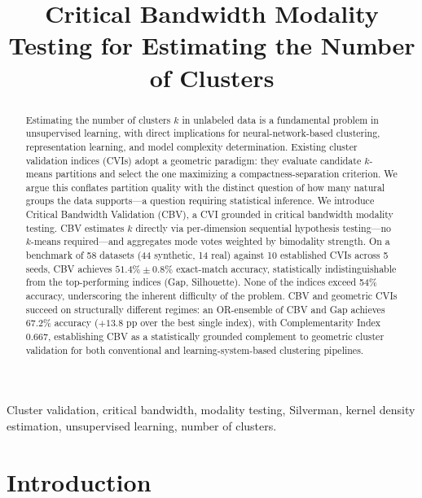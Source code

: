 \documentclass[journal]{IEEEtran}
\begin{document}
\title{Critical Bandwidth Modality Testing for Estimating the Number of Clusters}

\author{
}

\maketitle

\begin{abstract}
Estimating the number of clusters $k$ in unlabeled data is a fundamental problem in unsupervised learning, with direct implications for neural-network-based clustering, representation learning, and model complexity determination. Existing cluster validation indices (CVIs) adopt a geometric paradigm: they evaluate candidate $k$-means partitions and select the one maximizing a compactness-separation criterion. We argue this conflates partition quality with the distinct question of how many natural groups the data supports---a question requiring statistical inference. We introduce Critical Bandwidth Validation (CBV), a CVI grounded in critical bandwidth modality testing. CBV estimates $k$ directly via per-dimension sequential hypothesis testing---no $k$-means required---and aggregates mode votes weighted by bimodality strength. On a benchmark of 58 datasets (44 synthetic, 14 real) against 10 established CVIs across 5 seeds, CBV achieves $51.4\% \pm 0.8\%$ exact-match accuracy, statistically indistinguishable from the top-performing indices (Gap, Silhouette). None of the indices exceed 54\% accuracy, underscoring the inherent difficulty of the problem. CBV and geometric CVIs succeed on structurally different regimes: an OR-ensemble of CBV and Gap achieves $67.2\%$ accuracy ($+13.8$ pp over the best single index), with Complementarity Index $0.667$, establishing CBV as a statistically grounded complement to geometric cluster validation for both conventional and learning-system-based clustering pipelines.
\end{abstract}

\begin{IEEEkeywords}
Cluster validation, critical bandwidth, modality testing, Silverman, kernel density estimation, unsupervised learning, number of clusters.
\end{IEEEkeywords}

\section{Introduction}
\label{sec:introduction}
\end{document}

